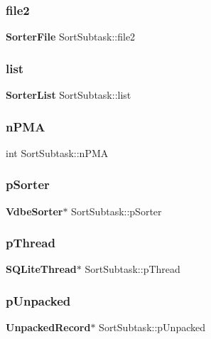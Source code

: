 \subsubsection{file2}
{\footnotesize\ttfamily \textbf{ Sorter\+File} Sort\+Subtask\+::file2}

\mbox{\label{struct_sort_subtask_a0a79fd21798a08ceede3febbd08c88a2}} 
\subsubsection{list}
{\footnotesize\ttfamily \textbf{ Sorter\+List} Sort\+Subtask\+::list}

\mbox{\label{struct_sort_subtask_a6ecceaeda562346b298aa9fb95355071}} 
\subsubsection{nPMA}
{\footnotesize\ttfamily int Sort\+Subtask\+::n\+P\+MA}

\mbox{\label{struct_sort_subtask_a2a8ec6b4b0d29090e3b33b1a6647655a}} 
\subsubsection{pSorter}
{\footnotesize\ttfamily \textbf{ Vdbe\+Sorter}$\ast$ Sort\+Subtask\+::p\+Sorter}

\mbox{\label{struct_sort_subtask_abb534010ac35e0c37e41c26712e7b58c}} 
\subsubsection{pThread}
{\footnotesize\ttfamily \textbf{ S\+Q\+Lite\+Thread}$\ast$ Sort\+Subtask\+::p\+Thread}

\mbox{\label{struct_sort_subtask_af2312bacbb7e4cbe905eae20a60a3f39}} 
\subsubsection{pUnpacked}
{\footnotesize\ttfamily \textbf{ Unpacked\+Record}$\ast$ Sort\+Subtask\+::p\+Unpacked}

